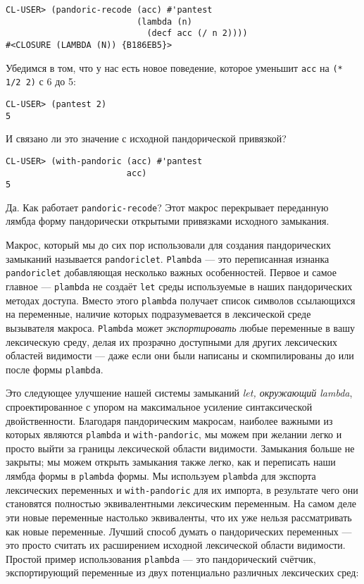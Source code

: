 \begin{verbatim}
CL-USER> (pandoric-recode (acc) #'pantest
                          (lambda (n)
                            (decf acc (/ n 2))))
#<CLOSURE (LAMBDA (N)) {B186EB5}>
\end{verbatim}

Убедимся в том, что у нас есть новое поведение, которое уменьшит \verb"acc" на \verb"(* 1/2 2)" с 6 до 5:

\begin{verbatim}
CL-USER> (pantest 2)
5
\end{verbatim}

И связано ли это значение с исходной пандорической привязкой?

\begin{verbatim}
CL-USER> (with-pandoric (acc) #'pantest
                        acc)
5
\end{verbatim}

Да. Как работает \verb"pandoric-recode"? Этот макрос перекрывает переданную лямбда форму пандорически открытыми привязками исходного замыкания.

Макрос, который мы до сих пор использовали для создания пандорических замыканий называется \verb"pandoriclet". \verb"Plambda" --- это переписанная изнанка \verb"pandoriclet" добавляющая несколько важных особенностей. Первое и самое главное --- \verb"plambda" не создаёт \verb"let" среды используемые в наших пандорических методах доступа. Вместо этого \verb"plambda" получает список символов ссылающихся на переменные, наличие которых подразумевается в лексической среде вызывателя макроса. \verb"Plambda" может \emph{экспортировать} любые переменные в вашу лексическую среду, делая их прозрачно доступными для других лексических областей видимости --- даже если они были написаны и скомпилированы до или после формы \verb"plambda".

Это следующее улучшение нашей системы замыканий \emph{let, окружающий lambda}, спроектированное с упором на максимальное усиление синтаксической двойственности. Благодаря пандорическим макросам, наиболее важными из которых являются \verb"plambda" и \verb"with-pandoric", мы можем при желании легко и просто выйти за границы лексической области видимости. Замыкания больше не закрыты; мы можем открыть замыкания также легко, как и переписать наши лямбда формы в \verb"plambda" формы. Мы используем \verb"plambda" для экспорта лексических переменных и \verb"with-pandoric" для их импорта, в результате чего они становятся полностью эквивалентными лексическим переменным. На самом деле эти новые переменные настолько эквиваленты, что их уже нельзя рассматривать как новые переменные. Лучший способ думать о пандорических переменных --- это просто считать их расширением исходной лексической области видимости. Простой пример использования \verb"plambda" --- это пандорический счётчик, экспортирующий переменные из двух потенциально различных лексических сред:

